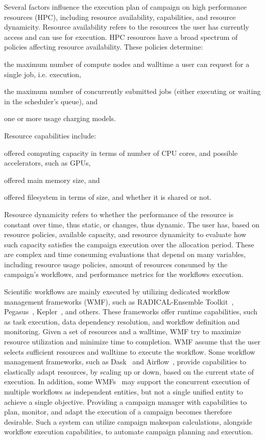 Several factors influence the execution plan of campaign on high performance resources (HPC), including resource availability, capabilities, and resource dynamicity. Resource availability refers to the resources the user has currently access and can use for execution. HPC resources have a broad spectrum of policies affecting resource availability. These policies determine:
\begin{inparaenum}[1)]
\item the maximum number of compute nodes and walltime a user can request for a single job, i.e. execution,
\item the maximum number of concurrently submitted jobs (either executing or waiting in the scheduler's queue), and
\item one or more usage charging models.
\end{inparaenum}
Resource capabilities include: 
\begin{inparaenum}[1)]
\item offered computing capacity in terms of number of CPU cores, and possible accelerators, such as GPUs,
\item offered main memory size, and
\item offered filesystem in terms of size, and whether it is shared or not.
\end{inparaenum} 
Resource dynamicity refers to whether the performance of the resource is constant over time, thus static, or changes, thus dynamic. The user has, based on resource policies, available capacity, and resource dynamicity to evaluate how such capacity satisfies the campaign execution over the allocation period. These are complex and time consuming evaluations that depend on many variables, including resource usage policies, amount of resources consumed by the campaign’s workflows, and performance metrics for the workflows execution.

Scientific workflows are mainly executed by utilizing dedicated workflow management frameworks (WMF), such as RADICAL-Ensemble Toolkit~\cite{balasubramanian2018harnessing}, Pegasus~\cite{deelman2015pegasus}, Kepler~\cite{ludascher2006concurrency}, and others. These frameworks offer runtime capabilities, such as task execution, data dependency resolution, and workflow definition and monitoring. Given a set of resources and a walltime, WMF try to maximize resource utilization and minimize time to completion. WMF assume that the user selects sufficient resources and walltime to execute the workflow. Some workflow management frameworks, such as Dask~\cite{rocklin2015dask} and Airflow~\cite{airflow}, provide capabilities to elastically adapt resources, by scaling up or down, based on the current state of execution. In addition, some  WMFs~\cite{deelman2015pegasus} may support the concurrent execution of multiple workflows as independent entities, but not a single unified entity to achieve a single objective. Providing a campaign manager with capabilities to plan, monitor, and adapt the execution of a campaign becomes therefore desirable. Such a system can utilize campaign makespan calculations, alongside workflow execution capabilities, to automate campaign planning and execution. 

